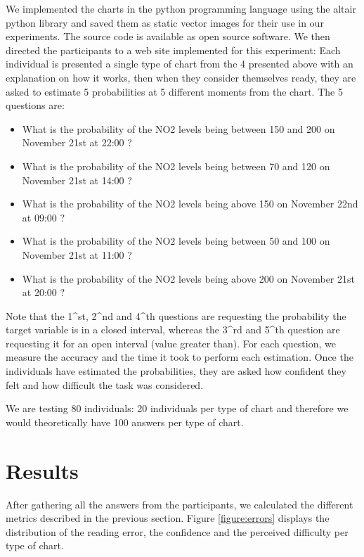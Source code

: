 \documentclass[a4paper,3p,sort&compress]{elsarticle}
\begin{document}
We implemented the charts in the python programming language using the altair python library 
\cite{vanderplas2018altair} and saved them as static vector images for their use in our experiments. The source code is 
available as open source software. We then directed the participants to a web site implemented for this experiment: 
Each individual is presented a 
single type of chart from the 4 presented above with an explanation on how it works, 
then when they consider themselves ready, they are asked to estimate 5 probabilities at 5 different moments from the chart. 
The 5 questions are:
\begin{itemize}
  \item What is the probability of the NO2 levels being between 150 and 200 on November 21st at 22:00 ?
  \item What is the probability of the NO2 levels being between 70 and 120 on November 21st at 14:00 ?
  \item What is the probability of the NO2 levels being above 150 on November 22nd at 09:00 ?
  \item What is the probability of the NO2 levels being between 50 and 100 on November 21st at 11:00 ?
  \item What is the probability of the NO2 levels being above 200 on November 21st at 20:00 ?
\end{itemize}

Note that the 1^st, 2^nd and 4^th questions are requesting the probability the target variable is in a closed interval, whereas
the 3^rd and 5^th question are requesting it for an open interval (value greater than). 
For each question, we measure the accuracy and the time it took to 
perform each estimation. Once the individuals have estimated the probabilities, they are asked how confident they 
felt and how difficult the task was considered.

We are testing 80 individuals: 20 individuals per type of chart and therefore we would theoretically have 100 answers per 
type of chart.

\section{Results}
\label{sec:results}


After gathering all the answers from the participants, we calculated the different metrics described in the previous section.
 Figure \ref{figure:errors} displays 
the distribution of the reading error, the confidence and the perceived difficulty per type of chart. 
\end{document}
